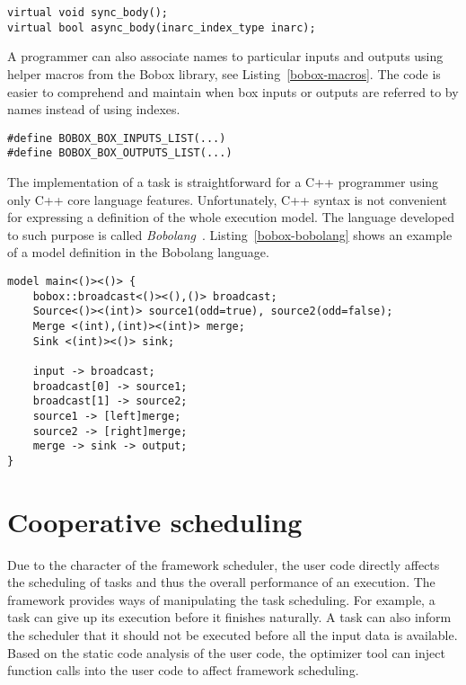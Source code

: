 \begin{lstlisting}[caption={The code representations of the box action step.},label={bobox-action-step}]
virtual void sync_body();
virtual bool async_body(inarc_index_type inarc);
\end{lstlisting}

A programmer can also associate names to particular inputs and outputs using helper macros from the Bobox library, see Listing~\ref{bobox-macros}. The code is easier to comprehend and maintain when box inputs or outputs are referred to by names instead of using indexes.

\begin{lstlisting}[caption={The helper macros for mapping of names to inputs and outputs.},label={bobox-macros}]
#define BOBOX_BOX_INPUTS_LIST(...)
#define BOBOX_BOX_OUTPUTS_LIST(...)
\end{lstlisting}

The implementation of a task is straightforward for a C++ programmer using only C++ core language features. Unfortunately, C++ syntax is not convenient for expressing a definition of the whole execution model. The language developed to such purpose is called \emph{Bobolang}~\cite{bobolang}. Listing~\ref{bobox-bobolang} shows an example of a model definition in the Bobolang language.

\begin{lstlisting}[caption={An example of the Bobolang usage.}, label={bobox-bobolang}]
model main<()><()> {
    bobox::broadcast<()><(),()> broadcast;
    Source<()><(int)> source1(odd=true), source2(odd=false);
    Merge <(int),(int)><(int)> merge;
    Sink <(int)><()> sink;
	
    input -> broadcast;
    broadcast[0] -> source1;
    broadcast[1] -> source2;
    source1 -> [left]merge;
    source2 -> [right]merge;
    merge -> sink -> output;
}
\end{lstlisting}

\section{Cooperative scheduling}
Due to the character of the framework scheduler, the user code directly affects the scheduling of tasks and thus the overall performance of an execution. The framework provides ways of manipulating the task scheduling. For example, a task can give up its execution before it finishes naturally. A task can also inform the scheduler that it should not be executed before all the input data is available. Based on the static code analysis of the user code, the optimizer tool can inject function calls into the user code to affect framework scheduling.